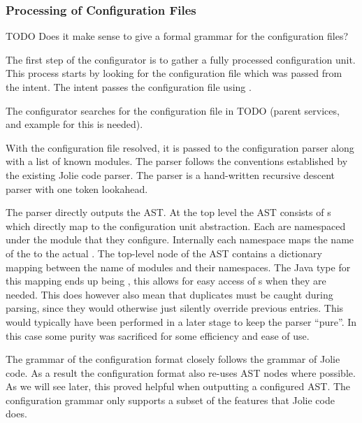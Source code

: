 \subsubsection*{Processing of Configuration Files}

TODO Does it make sense to give a formal grammar for the configuration files?


The first step of the configurator is to gather a fully processed configuration
unit. This process starts by looking for the configuration file which was
passed from the intent. The intent passes the configuration file using
.


The configurator searches for the configuration file in TODO (parent services,
and example for this is needed).


With the configuration file resolved, it is passed to the configuration parser
along with a list of known modules. The parser follows the conventions
established by the existing Jolie code parser. The parser is a hand-written
recursive descent parser with one token lookahead.

The parser directly outputs the AST. At the top level the AST consists of
s which directly map to the configuration unit abstraction. Each
 are namespaced under the module that they configure. Internally
each namespace maps the name of the  to the actual
. The top-level node of the AST contains a dictionary mapping
between the name of modules and their namespaces. The Java type for this
mapping ends up being , this allows for
easy access of s when they are needed. This does however also
mean that duplicates must be caught during parsing, since they would otherwise
just silently override previous entries. This would typically have been
performed in a later stage to keep the parser ``pure''. In this case some
purity was sacrificed for some efficiency and ease of use.

The grammar of the configuration format closely follows the grammar of Jolie
code. As a result the configuration format also re-uses AST nodes where
possible. As we will see later, this proved helpful when outputting a
configured AST. The configuration grammar only supports a subset of the
features that Jolie code does.

